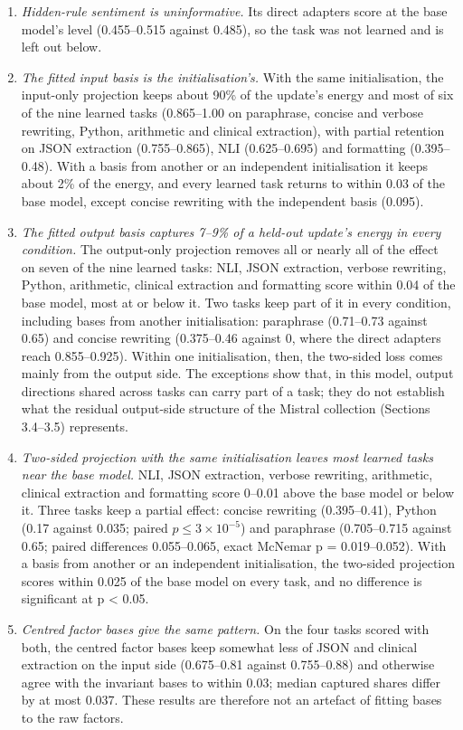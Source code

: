 \documentclass[
  11pt,
]{article}
\providecommand{\tightlist}{%
  \setlength{\itemsep}{0pt}\setlength{\parskip}{0pt}}
\begin{document}
\begin{enumerate}
\def\labelenumi{\arabic{enumi}.}
\tightlist
\item
  \emph{Hidden-rule sentiment is uninformative.} Its direct adapters
  score at the base model's level (0.455--0.515 against 0.485), so the
  task was not learned and is left out below.
\item
  \emph{The fitted input basis is the initialisation's.} With the same
  initialisation, the input-only projection keeps about 90\% of the
  update's energy and most of six of the nine learned tasks (0.865--1.00
  on paraphrase, concise and verbose rewriting, Python, arithmetic and
  clinical extraction), with partial retention on JSON extraction
  (0.755--0.865), NLI (0.625--0.695) and formatting (0.395--0.48). With
  a basis from another or an independent initialisation it keeps about
  2\% of the energy, and every learned task returns to within 0.03 of
  the base model, except concise rewriting with the independent basis
  (0.095).
\item
  \emph{The fitted output basis captures 7--9\% of a held-out update's
  energy in every condition.} The output-only projection removes all or
  nearly all of the effect on seven of the nine learned tasks: NLI, JSON
  extraction, verbose rewriting, Python, arithmetic, clinical extraction
  and formatting score within 0.04 of the base model, most at or below
  it. Two tasks keep part of it in every condition, including bases from
  another initialisation: paraphrase (0.71--0.73 against 0.65) and
  concise rewriting (0.375--0.46 against 0, where the direct adapters
  reach 0.855--0.925). Within one initialisation, then, the two-sided
  loss comes mainly from the output side. The exceptions show that, in
  this model, output directions shared across tasks can carry part of a
  task; they do not establish what the residual output-side structure of
  the Mistral collection (Sections 3.4--3.5) represents.
\item
  \emph{Two-sided projection with the same initialisation leaves most
  learned tasks near the base model.} NLI, JSON extraction, verbose
  rewriting, arithmetic, clinical extraction and formatting score
  0--0.01 above the base model or below it. Three tasks keep a partial
  effect: concise rewriting (0.395--0.41), Python (0.17 against 0.035;
  paired \(p \le 3 \times 10^{-5}\)) and paraphrase (0.705--0.715
  against 0.65; paired differences 0.055--0.065, exact McNemar p =
  0.019--0.052). With a basis from another or an independent
  initialisation, the two-sided projection scores within 0.025 of the
  base model on every task, and no difference is significant at p
  \textless{} 0.05.
\item
  \emph{Centred factor bases give the same pattern.} On the four tasks
  scored with both, the centred factor bases keep somewhat less of JSON
  and clinical extraction on the input side (0.675--0.81 against
  0.755--0.88) and otherwise agree with the invariant bases to within
  0.03; median captured shares differ by at most 0.037. These results
  are therefore not an artefact of fitting bases to the raw factors.
\end{enumerate}
\end{document}
